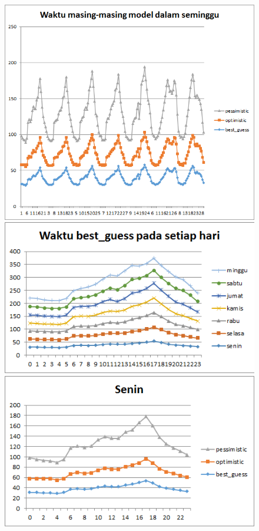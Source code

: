 \begin{figure}[H]
				\centering		
				\includegraphics[scale=0.8]{Gambar/waktuallmodelsampel208052017.png}
				\includegraphics[]{Gambar/waktubestguesssampel208052017.png}
				\includegraphics[]{Gambar/seninsampel208052017.png}
\end{figure}
			
